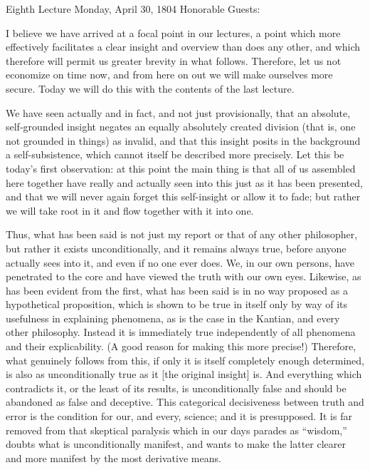 Eighth Lecture
Monday, April 30, 1804
Honorable Guests:

I believe we have arrived at a focal point in our lectures,
a point which more effectively facilitates
a clear insight and overview than does any other,
and which therefore will permit us greater brevity in what follows.
Therefore, let us not economize on time now,
and from here on out we will make ourselves more secure.
Today we will do this with the contents of the last lecture.

We have seen actually and in fact,
and not just provisionally,
that an absolute, self-grounded insight negates
an equally absolutely created division
(that is, one not grounded in things)
as invalid, and that this insight posits
in the background a self-subsistence,
which cannot itself be described more precisely.
Let this be today's first observation:
at this point the main thing is that
all of us assembled here together have
really and actually seen into this
just as it has been presented,
and that we will never again forget this
self-insight or allow it to fade;
but rather we will take root in it
and flow together with it into one.

Thus, what has been said is not just my report
or that of any other philosopher,
but rather it exists unconditionally,
and it remains always true,
before anyone actually sees into it,
and even if no one ever does.
We, in our own persons, have penetrated to the core
and have viewed the truth with our own eyes.
Likewise, as has been evident from the first,
what has been said is in no way proposed
as a hypothetical proposition,
which is shown to be true in itself
only by way of its usefulness in explaining phenomena,
as is the case in the Kantian, and every other philosophy.
Instead it is immediately true independently of
all phenomena and their explicability.
(A good reason for making this more precise!)
Therefore, what genuinely follows from this,
if only it is itself completely enough determined,
is also as unconditionally true as it [the original insight] is.
And everything which contradicts it,
or the least of its results, is unconditionally false
and should be abandoned as false and deceptive.
This categorical decisiveness between truth and error
is the condition for our, and every, science;
and it is presupposed.
It is far removed from that skeptical paralysis
which in our days parades as “wisdom,”
doubts what is unconditionally manifest,
and wants to make the latter clearer
and more manifest by the most derivative means.

